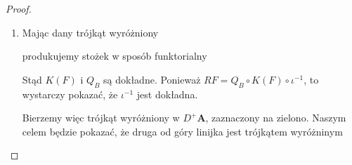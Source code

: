\begin{proof}
  \begin{enumerate}
    \item Mając dany trójkąt wyróżniony  produkujemy stożek w sposób funktorialny
      \begin{center}\end{center}

      Stąd $K(F)$ i $Q_B$ są dokładne. Ponieważ $RF=Q_B\circ K(F)\circ \iota^{-1}$, to wystarczy pokazać, że $\iota^{-1}$ jest dokładna.

      Bierzemy więc trójkąt wyróżniony w $D^+\mathbf{A}$, zaznaczony na zielono. Naszym celem będzie pokazać, że druga od góry linijka jest trójkątem wyróżninym
      \begin{center}
\end{center}
\end{enumerate}
\end{proof}
